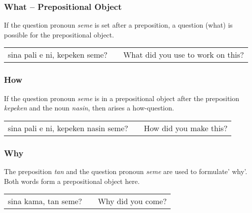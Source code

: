 \subsubsection*{What -- Prepositional Object}

%
If the question pronoun \textit{seme} is set after a preposition, a question (what) is possible for the prepositional object. \\

\begin{supertabular}{p{5,5cm}|ll}
sina pali e ni, kepeken seme? &&  What did you use to work on this? \\
\end{supertabular} 

%
\subsubsection*{How}
%
%
If the question pronoun \textit{seme} is in a prepositional object after the preposition \textit{kepeken} and the noun \textit{nasin}, then arises a how-question.

\begin{supertabular}{p{5,5cm}|ll}
sina pali e ni, kepeken nasin seme? && How did you make this? \\
\end{supertabular}  

%
\subsubsection*{Why}
%
%
The preposition \textit{tan} and the question pronoun \textit{seme} are used to formulate' why'. 
Both words form a prepositional object here.

\begin{supertabular}{p{5,5cm}|ll}
sina kama, tan seme? && Why did you come? \\
\end{supertabular} 

